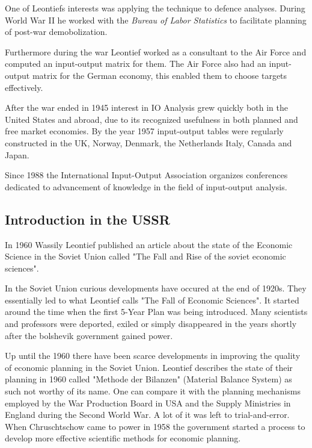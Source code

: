 \documentclass[12pt,a4paper]{scrartcl}
\begin{document}
	One of Leontiefs interests was applying the technique to defence analyses. During World War II he worked with the \textit{Bureau of Labor Statistics} to facilitate planning of post-war demobolization.
	
	Furthermore during the war Leontief worked as a consultant to the Air Force and computed an input-output matrix for them. The Air Force also had an input-output matrix for the German economy, this enabled them to choose targets effectively.
	
	After the war ended in 1945 interest in IO Analysis grew quickly both in the United States and abroad, due to its recognized usefulness in both planned and free market economies. By the year 1957 input-output tables were regularly constructed in the UK, Norway, Denmark, the Netherlands Italy, Canada and Japan.
	
	
	Since 1988 the International Input-Output Association organizes conferences dedicated to advancement of knowledge in the field of input-output analysis.
	
	\subsection{Introduction in the USSR} \label{ussr}
	
	In 1960 Wassily Leontief published an article about the state of the Economic Science in the Soviet Union called "The Fall and Rise of the soviet economic sciences".
	
	In the Soviet Union curious developments have occured at the end of 1920s. They essentially led to what Leontief calls "The Fall of Economic Sciences". It started around the time when the first 5-Year Plan was being introduced. Many scientists and professors were deported, exiled or simply disappeared in the years shortly after the bolshevik government gained power.
	
	Up until the 1960 there have been scarce developments in improving the quality of economic planning in the Soviet Union. Leontief describes the state of their planning in 1960 called "Methode der Bilanzen" (Material Balance System) as such not worthy of its name. One can compare it with the planning mechanisms employed by the War Production Board in USA and the Supply Ministries in England during the Second World War. A lot of it was left to trial-and-error. When Chruschtschow came to power in 1958 the government started a process to develop more effective scientific methods for economic planning. 
	
\end{document}
